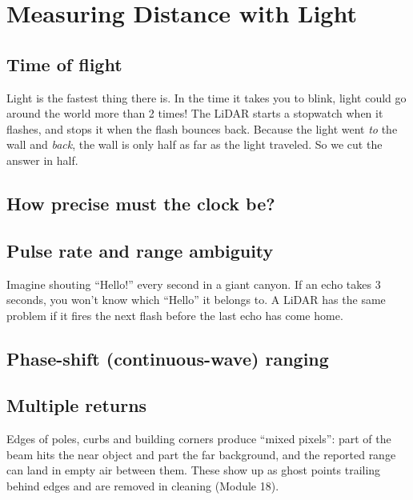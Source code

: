 \chapter{Measuring Distance with Light}

\section{Time of flight}


\begin{kid}
Light is the fastest thing there is. In the time it takes you to blink, light could go around the world more than 2 times! The LiDAR starts a stopwatch when it flashes, and stops it when the flash bounces back. Because the light went \emph{to} the wall and \emph{back}, the wall is only half as far as the light traveled. So we cut the answer in half.
\end{kid}

\section{How precise must the clock be?}


\section{Pulse rate and range ambiguity}

\begin{kid}
Imagine shouting ``Hello!'' every second in a giant canyon. If an echo takes 3 seconds, you won't know which ``Hello'' it belongs to. A LiDAR has the same problem if it fires the next flash before the last echo has come home.
\end{kid}


\section{Phase-shift (continuous-wave) ranging}


\section{Multiple returns}


\begin{tip}
Edges of poles, curbs and building corners produce ``mixed pixels'': part of the beam hits the near object and part the far background, and the reported range can land in empty air between them. These show up as ghost points trailing behind edges and are removed in cleaning (Module 18).
\end{tip}
